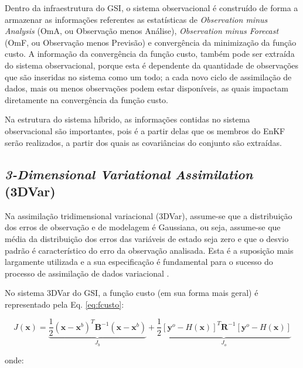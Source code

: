 Dentro da infraestrutura do GSI, o sistema observacional é construído de forma a armazenar as informações referentes as estatísticas de \textit{Observation minus Analysis} (OmA, ou Observação menos Análise), \textit{Observation minus Forecast} (OmF, ou Observação menos Previsão) e convergência da minimização da função custo. A informação da convergência da função custo, também pode ser extraída do sistema observacional, porque esta é dependente da quantidade de observações que são inseridas no sistema como um todo; a cada  novo ciclo de assimilação de dados, mais ou menos observações podem estar disponíveis, as quais impactam diretamente na convergência da função custo. 

Na estrutura do sistema híbrido, as informações contidas no sistema observacional são importantes, pois é a partir delas que os membros do EnKF serão realizados, a partir dos quais as covariâncias do conjunto são extraídas. 

\subsection{\textit{3-Dimensional Variational Assimilation} (3DVar)}
\label{sec:3dvar}

Na assimilação tridimensional variacional (3DVar), assume-se que a distribuição dos erros de observação e de modelagem é Gaussiana, ou seja, assume-se que média da distribuição dos erros das variáveis de estado seja zero e que o desvio padrão é característico do erro da observação analisada. Esta é a suposição mais largamente utilizada e a sua especificação é fundamental para o sucesso do processo de assimilação de dados variacional \cite{lorenc/1986}.

No sistema 3DVar do GSI, a função custo (em sua forma mais geral) é representado pela Eq. \ref{eq:fcusto}:

\begin{equation}
    \label{eq:fcusto}
    J(\mathbf{x}) = \underbrace{ \frac{1}{2} (\mathbf{x} - \mathbf{x}^{b})^{T} \mathbf{B}^{-1} (\mathbf{x} - \mathbf{x}^{b}) } _{J_{b}} + \underbrace{ \frac{1}{2} [\mathbf{y}^{o} - H(\mathbf{x})]^{T} \mathbf{R}^{-1} [\mathbf{y}^{o} - H(\mathbf{x})] }_{J_{o}}
\end{equation}

onde:

